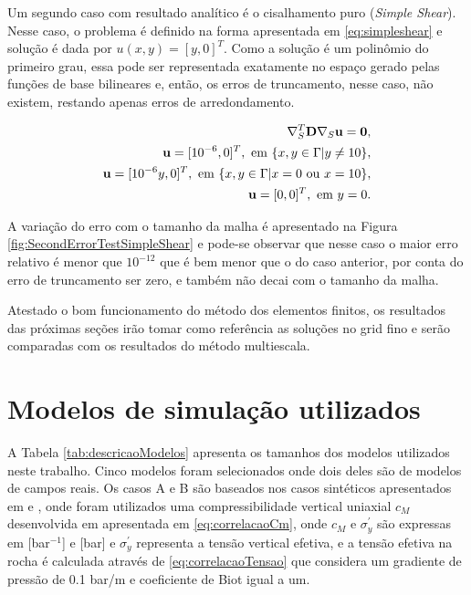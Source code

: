     
Um segundo caso com resultado analítico é o cisalhamento puro (\textit{Simple Shear}). Nesse caso, o problema é definido na forma apresentada em \eqref{eq:simpleshear}  e solução é dada por $u(x,y) = [y, 0]^T$. Como a solução é um polinômio do primeiro grau, essa pode ser representada exatamente no espaço gerado pelas funções de base bilineares e, então, os erros de truncamento, nesse caso, não existem, restando apenas  erros de arredondamento. 

\begin{equation}\label{eq:simpleshear}
    \begin{aligned}
       \nabla_S^T \mathbf{D} \nabla_S  \mathbf{u} = \mathbf{0} , \\
        \mathbf{u} = [10^{-6}, 0]^T, \text{ em } \{x, y \in \Gamma | y \neq 10\} ,\\
        \mathbf{u} = [10^{-6}y, 0]^T, \text{ em } \{x, y \in \Gamma | x = 0 \text{ ou } x = 10\}, \\
        \mathbf{u} = [0, 0]^T, \text{ em } y=0.
    \end{aligned}
\end{equation}

A variação do erro com o tamanho da malha é apresentado na Figura \ref{fig:SecondErrorTestSimpleShear} e pode-se observar que nesse caso o maior erro relativo é menor que $10^{-12}$ que é bem menor que o do caso anterior, por conta do erro de truncamento ser zero, e também não decai com o tamanho da malha.

Atestado o bom funcionamento do método dos elementos finitos, os resultados das próximas seções irão tomar como referência as soluções no grid fino e serão comparadas com os resultados do método multiescala.


\section{Modelos de simulação utilizados}

 A Tabela \ref{tab:descricaoModelos} apresenta os tamanhos dos modelos utilizados neste trabalho. Cinco modelos foram selecionados onde dois deles são de modelos de campos reais. Os casos A e B são baseados nos casos sintéticos apresentados em \cite{casteletto} e \cite{irina}, onde foram utilizados uma compressibilidade vertical uniaxial $c_M$ desenvolvida em \citet{correlacaoE} apresentada em \eqref{eq:correlacaoCm}, onde $c_M$ e $\sigma_y^\prime$ são expressas em [bar$^{-1}$] e [bar] e  $\sigma_y^\prime$ representa a tensão vertical efetiva, e a tensão efetiva na rocha é calculada através de  \eqref{eq:correlacaoTensao} que considera um gradiente de pressão de 0.1 bar/m e coeficiente de Biot igual a um.

